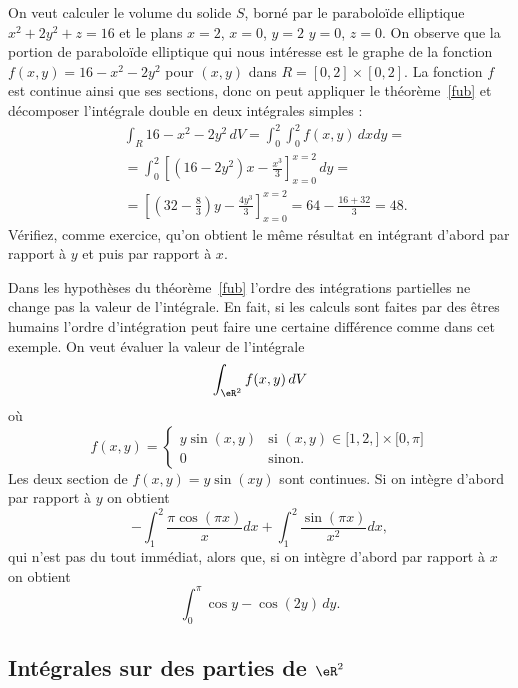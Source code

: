 \begin{example}
On veut calculer le volume du solide $S$, borné par le paraboloïde elliptique $x^2+2y^2+z=16$ et le plans $x=2$, $x=0$, $y=2$ $y=0$, $z=0$. On observe que la portion de  paraboloïde elliptique qui nous intéresse est le graphe de la fonction $f(x,y)=16-x^2-2y^2$ pour $(x,y)$ dans $R=[0,2]\times[0,2]$. La fonction $f$ est continue ainsi que ses sections, donc on peut appliquer le théorème~\ref{fub} et décomposer l'intégrale double en deux intégrales simples :
\begin{equation}
  \begin{aligned}
   & \int_R 16-x^2-2y^2 \,dV= \int_{0}^2\int_{0}^2f(x,y)\,dx dy= \\
&=\int_0^2 \left[(16-2y^2)x-\frac{x^3}{3}\right]_{x=0}^{x=2}\, dy =\\
& = \left[ \left(32-\frac{8}{3}\right) y -\frac{4y^3}{3}\right]_{x=0}^{x=2}= 64- \frac{16+32}{3}=48.
  \end{aligned}
\end{equation}
Vérifiez, comme exercice, qu'on obtient le même résultat en intégrant d'abord par rapport à $y$ et puis par rapport à $x$.
\end{example}

\begin{example}
  Dans les hypothèses du théorème~\ref{fub}  l'ordre des intégrations partielles ne change pas la valeur de l'intégrale. En fait, si les calculs sont faites par des êtres humains l'ordre d'intégration peut faire une certaine différence comme dans cet exemple. On veut évaluer la valeur de l'intégrale
\[
\int_{\eR^2}f(x,y)\, dV
\]
où
\begin{equation}
	f(x,y)=\begin{cases}
		y\sin(x,y)	&	\text{si }(x,y)\in\mathopen[ 1,2 ,  \mathclose]\times\mathopen[ 0 , \pi \mathclose]\\
		0	&	 \text{sinon.}
	\end{cases}
\end{equation}
Les deux section de $f(x,y)=y\sin(xy)$ sont continues. Si on intègre d'abord par rapport à $y$ on obtient
\[
-\int_1^2\frac{ \pi\cos(\pi x) }{ x }dx+\int_1^2\frac{ \sin(\pi x) }{ x^2 }dx,
\]
qui n'est pas du tout immédiat, alors que, si on intègre d'abord par rapport à $x$ on obtient
\[
\int_0^\pi \cos y - \cos(2y)\,dy.
\]
\end{example}

\subsection{Intégrales sur des parties de $\eR^2$ }

